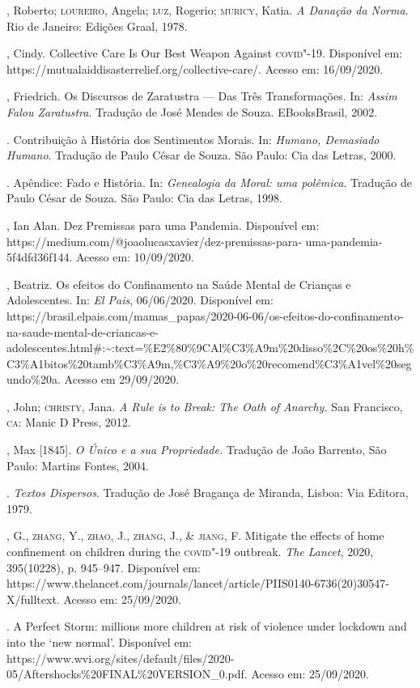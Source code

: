 \begin{bibliohedra}
, Roberto; \textsc{loureiro}, Angela; \textsc{luz}, Rogerio; \textsc{muricy}, Katia. \emph{A
Danação da Norma}. Rio de Janeiro: Edições Graal, 1978.

, Cindy. Collective Care Is Our Best Weapon Against \textsc{covid}"-19.
Disponível em: https://mutualaiddisasterrelief.org/collective-care/.
Acesso em: 16/09/2020.

, Friedrich. Os Discursos de Zaratustra --- Das Três
Transformações. In: \emph{Assim Falou Zaratustra}. Tradução de José
Mendes de Souza. EBooksBrasil, 2002.

\titidem. Contribuição à História dos Sentimentos Morais. In:
\emph{Humano, Demasiado Humano}. Tradução de Paulo César de Souza. São
Paulo: Cia das Letras, 2000.

\titidem. Apêndice: Fado e História. In: \emph{Genealogia da Moral: uma
polêmica}. Tradução de Paulo César de Souza. São Paulo: Cia das Letras,
1998.

, Ian Alan. Dez Premissas para uma Pandemia. Disponível em:
https://medium.com/@joaolucasxavier/dez-premissas-para-
uma-pandemia-5f4dfd36f144. Acesso em: 10/09/2020.

, Beatriz. Os efeitos do Confinamento na Saúde Mental de
Crianças e Adolescentes. In: \emph{El Pais}, 06/06/2020. Disponível em:
https://brasil.elpais.com/mamas\_papas/2020-06-06/os-efeitos-do-confinamento-na-saude-mental-de-criancas-e-adolescentes.html\#:\textasciitilde{}:text=\%E2\%80\%9CAl\%C3\%A9m\%20disso\%2C\%20os\%20h\%C3\%A1bitos\%20tamb\%C3\%A9m,\%C3\%A9\%20o\%20recomend\%C3\%A1vel\%20segundo\%20a.
Acesso em 29/09/2020.

, John; \textsc{christy}, Jana. \emph{A Rule is to Break: The Oath of
Anarchy.} San Francisco, \textsc{ca}: Manic D Press, 2012.

, Max {[}1845{]}. \emph{O Único e a sua Propriedade.} Tradução de
João Barrento, São Paulo: Martins Fontes, 2004.

\titidem. \emph{Textos Dispersos}. Tradução de José Bragança de Miranda,
Lisboa: Via Editora, 1979.

, G., \textsc{zhang}, Y., \textsc{zhao}, J., \textsc{zhang}, J., \& \textsc{jiang}, F. Mitigate the
effects of home confinement on children during the \textsc{covid}"-19 outbreak.
\emph{The Lancet}, 2020, 395(10228), p. 945--947. Disponível em:
https://www.thelancet.com/journals/lancet/article/PIIS0140-6736(20)30547-X/fulltext.
Acesso em: 25/09/2020.

. A Perfect Storm: millions more children at risk of
violence under lockdown and into the `new normal'. Disponível em:
https://www.wvi.org/sites/default/files/2020-05/Aftershocks\%20FINAL\%20VERSION\_0.pdf.
Acesso em: 25/09/2020.
\end{bibliohedra}


